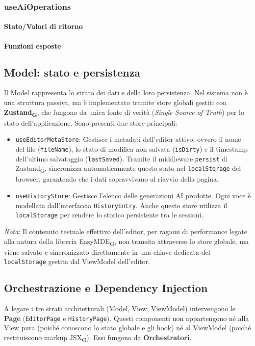\documentclass[11pt,a4paper]{article}
\newcommand{\gls}[1]{#1\textsubscript{G}}
\begin{document}
\subsubsection{useAiOperations}
\paragraph{Stato/Valori di ritorno}
\paragraph{Funzioni esposte}


\newpage
\subsection{Model: stato e persistenza}
Il Model rappresenta lo strato dei dati e della loro persistenza. Nel sistema non è una struttura passiva, ma è implementato tramite store globali gestiti con \textbf{\gls{Zustand}}, che fungono da unica fonte di verità (\textit{Single Source of Truth}) per lo stato dell'applicazione.
Sono presenti due store principali:
\begin{itemize}
    \item \texttt{useEditorMetaStore}: Gestisce i metadati dell'editor attivo, ovvero il nome del file (\texttt{fileName}), lo stato di modifica non salvata (\texttt{isDirty}) e il timestamp dell'ultimo salvataggio (\texttt{lastSaved}). Tramite il middleware \texttt{persist} di \gls{Zustand}, sincronizza automaticamente questo stato nel \texttt{localStorage} del browser, garantendo che i dati sopravvivano al riavvio della pagina.
    \item \texttt{useHistoryStore}: Gestisce l'elenco delle generazioni AI prodotte. Ogni voce è modellata dall'interfaccia \texttt{HistoryEntry}. Anche questo store utilizza il \texttt{localStorage} per rendere lo storico persistente tra le sessioni.
\end{itemize}

\textit{Nota}: Il contenuto testuale effettivo dell'editor, per ragioni di performance legate alla natura della libreria \gls{EasyMDE}, non transita attraverso lo store globale, ma viene salvato e sincronizzato direttamente in una chiave dedicata del \texttt{localStorage} gestita dal ViewModel dell'editor.


\newpage

\subsection{Orchestrazione e Dependency Injection}
A legare i tre strati architetturali (Model, View, ViewModel) intervengono le \textbf{Page} (\texttt{EditorPage} e \texttt{HistoryPage}). Questi componenti non appartengono né alla View pura (poiché conoscono lo stato globale e gli hook) né al ViewModel (poiché restituiscono markup \gls{JSX}). Essi fungono da \textbf{Orchestratori}.
\end{document}
